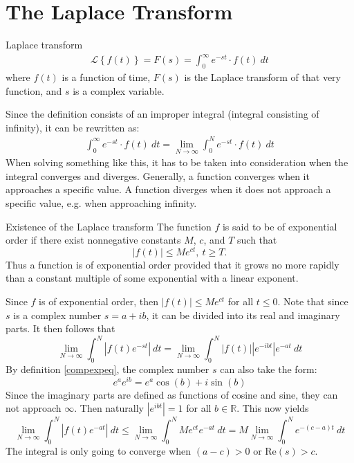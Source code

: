 \section{The Laplace Transform}
\begin{definition}{Laplace transform}{}
\begin{align}
\mathcal{L} \left\{f(t) \right\}=F(s)=\int_{0}^{\infty} e^{-st}\cdot f(t)\ dt
\end{align} \label{lpdef}
where $f(t)$ is a function of time, $F(s)$ is the Laplace transform of that very function, and $s$ is a complex variable.
\end{definition}
Since the definition consists of an improper integral (integral consisting of infinity), it can be rewritten as:
\begin{align}
\int_{0}^{\infty} e^{-st}\cdot f(t)\ dt = \lim_{N \to \infty} \int_{0}^{N} e^{-st}\cdot f(t)\ dt
\end{align}
When solving something like this, it has to be taken into consideration when the integral converges and diverges. Generally, a function converges when it approaches a specific value. A function diverges when it does not approach a specific value, e.g. when approaching infinity.

\begin{theorem}{Existence of the Laplace transform}{}
The function $f$ is said to be of exponential order if there exist nonnegative constants $M$, $c$, and $T$  such that $$|f(t)| \leq Me^{ct}, \ t \geq T.$$
Thus a function is of exponential order provided that it grows no more rapidly than a constant multiple of some exponential with a linear exponent. \cite[p. 320]{diffandcomplex}
\end{theorem}
\begin{prof}{}{}
Since $f$ is of exponential order, then $|f(t)| \leq Me^{ct}$ for all $t \leq 0$. Note that since $s$ is a complex number  $s=a+ib$, it can be divided into its real and imaginary parts. It then follows that $$\lim_{N \to \infty} \int_{0}^{N} |f(t)e^{-st}|\ dt = \lim_{N \to \infty} \int_{0}^{N} |f(t)| |e^{-ibt}|e^{-at}\ dt$$
By definition \ref{compexpeq}, the complex number $s$ can also take the form: 
$$e^{a}e^{ib}= e^{a}\cos(b)+i\sin(b)$$
Since the imaginary parts are defined as functions of cosine and sine, they can not approach $\infty$. Then naturally $|e^{ibt}|=1$ for all $b \in \mathbb{R}$. This now yields $$\lim_{N \to \infty} \int_{0}^{N} |f(t)e^{-at}|\ dt \leq \lim_{N \to \infty} \int_{0}^{N} Me^{ct}e^{-at}\ dt = M \lim_{N \to \infty} \int_{0}^{N}e^{-(c-a)t}\ dt $$ The integral is only going to converge when $(a-c)>0$ or Re$(s)>c$.
\end{prof}


